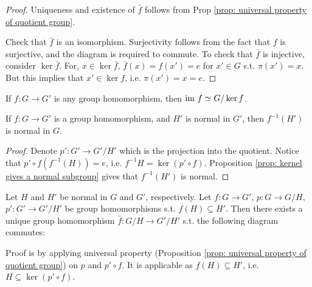 \begin{proof}
    Uniqueness and existence of $\bar{f}$ follows from Prop \ref{prop: universal property of quotient group}. 

    Check that $\bar{f}$ is an isomorphism. Surjectivity follows from the fact that $f$ is surjective, and the diagram is required to commute. To check that $\bar{f}$ is injective, consider $\ker \bar{f}$. For, $x \in \ker \bar{f}$, $\bar{f}(x) = f(x') = e$ for $x' \in G$ s.t. $\pi(x') = x$. But this implies that $x' \in \ker f$, i.e. $\pi(x') = x = e$.
\end{proof}

\begin{corollary}
    If $f: G \to G'$ is any group homomorphism, then $\mathrm{im}\  f \simeq G/\ker f$.
\end{corollary}

\begin{remark}
    If $f: G \to G'$ is a group homomorphism, and $H'$ is normal in $G'$, then $f^{-1}(H')$ is normal in $G$.
\end{remark}

\begin{proof}
    Denote $p': G' \to G'/H'$ which is the projection into the quotient. Notice that $p' \circ f (f^{-1}(H)) = e$, i.e. $f^{-1}H = \ker (p' \circ f)$. Proposition \ref{prop: kernel gives a normal subgroup} gives that $f^{-1}(H')$ is normal. 
\end{proof}

\begin{remark}\label{rmk: transformation between quotient on normal subgroups}
    Let $H$ and $H'$ be normal in $G$ and $G'$, respectively. Let $f: G \to G'$, $p: G \to G/H$, $p': G' \to G'/H'$ be group homomorphisms s.t. $f(H) \subseteq H'$. Then there exists a unique group homomorphism $\bar{f}: G/H \to G'/H'$ s.t. the following diagram commutes:
    
    \begin{minipage}{\linewidth}
        \centering
    \end{minipage}

    Proof is by applying universal property (Proposition \ref{prop: universal property of quotient group}) on $p$ and $p' \circ f$. It is applicable as $f(H) \subseteq H'$, i.e. $H \subseteq \ker (p' \circ f)$.
\end{remark}



